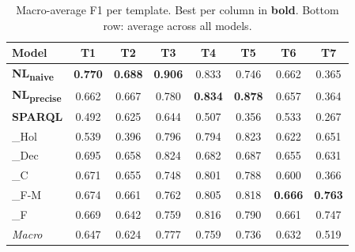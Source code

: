 \begin{table}[t]
\centering\small
\setlength{\tabcolsep}{4pt}
\begin{tabular}{lccccccc}
\toprule
\textbf{Model} & \textbf{T1} & \textbf{T2} & \textbf{T3} & \textbf{T4} & \textbf{T5} & \textbf{T6} & \textbf{T7} \\
\midrule
\textbf{NL\textsubscript{naive}} & \textbf{0.770} & \textbf{0.688} & \textbf{0.906} & 0.833 & 0.746 & 0.662 & 0.365 \\
\textbf{NL\textsubscript{precise}} & 0.662 & 0.667 & 0.780 & \textbf{0.834} & \textbf{0.878} & 0.657 & 0.364 \\
\textbf{SPARQL} & 0.492 & 0.625 & 0.644 & 0.507 & 0.356 & 0.533 & 0.267 \\
\sys{}\_Hol & 0.539 & 0.396 & 0.796 & 0.794 & 0.823 & 0.622 & 0.651 \\
\sys{}\_Dec & 0.695 & 0.658 & 0.824 & 0.682 & 0.687 & 0.655 & 0.631 \\
\sys{}\_C & 0.671 & 0.655 & 0.748 & 0.801 & 0.788 & 0.600 & 0.366 \\
\sys{}\_F-M & 0.674 & 0.661 & 0.762 & 0.805 & 0.818 & \textbf{0.666} & \textbf{0.763} \\
\sys{}\_F & 0.669 & 0.642 & 0.759 & 0.816 & 0.790 & 0.661 & 0.747 \\
\midrule
\textit{Macro} & 0.647 & 0.624 & 0.777 & 0.759 & 0.736 & 0.632 & 0.519 \\
\bottomrule
\end{tabular}
\caption{Macro-average F1 per template. Best per column in \textbf{bold}. Bottom row: average across all models.}
\label{tab:f1_per_template}
\end{table}